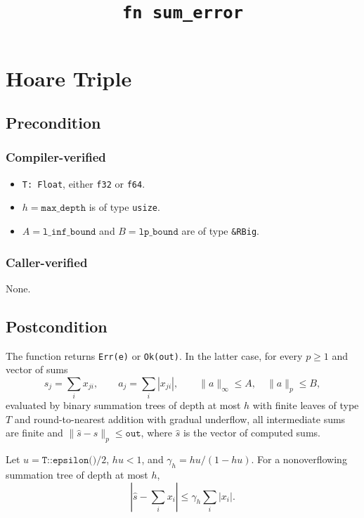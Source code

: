 \documentclass{article}
\title{\texttt{fn sum\_error}}
\author{\MichaelShoemateAuthor}
\begin{document}
\maketitle
\contrib

\section{Hoare Triple}
\subsection*{Precondition}
\subsubsection*{Compiler-verified}
\begin{itemize}
    \item \texttt{T: Float}, either \texttt{f32} or \texttt{f64}.
    \item $h=\texttt{max\_depth}$ is of type \texttt{usize}.
    \item $A=\texttt{l\_inf\_bound}$ and $B=\texttt{lp\_bound}$ are of type \texttt{\&RBig}.
\end{itemize}

\subsubsection*{Caller-verified}
None.

\subsection*{Postcondition}
\begin{theorem}
    \label{postcondition}
    The function returns \texttt{Err(e)} or \texttt{Ok(out)}.
    In the latter case, for every $p\ge1$ and vector of sums
    \[
        s_j=\sum_i x_{ji},\qquad a_j=\sum_i |x_{ji}|,
        \qquad \|a\|_\infty\le A,\quad \|a\|_p\le B,
    \]
    evaluated by binary summation trees of depth at most $h$ with finite
    leaves of type $T$ and round-to-nearest addition with gradual underflow,
    all intermediate sums are finite and
    $\|\widehat{s}-s\|_p\le\texttt{out}$,
    where $\widehat{s}$ is the vector of computed sums.
\end{theorem}

\begin{lemma}\label{accuracy-bound}
    Let $u=\texttt{T::epsilon()}/2$, $hu<1$, and $\gamma_h=hu/(1-hu)$.
    For a nonoverflowing summation tree of depth at most $h$,
    \[
        \left|\widehat{s}-\sum_i x_i\right|\le\gamma_h\sum_i|x_i|.
    \]
\end{lemma}
\end{document}
